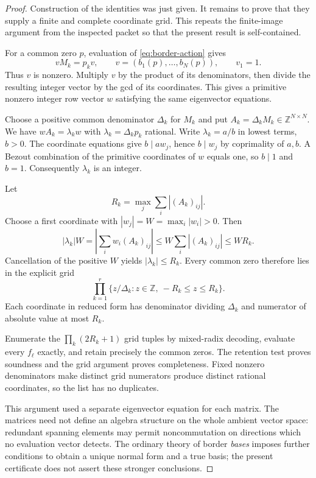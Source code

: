 \begin{proof}
Construction of the identities was just given. It remains to prove that
they supply a finite and complete coordinate grid. This repeats the
finite-image argument from the inspected packet so that the present
result is self-contained.

For a common zero $p$, evaluation of \eqref{eq:border-action} gives
\[
       vM_k=p_kv,\qquad v=(b_1(p),\ldots,b_N(p)),\qquad v_1=1.
\]
Thus $v$ is nonzero. Multiply $v$ by the product of its denominators,
then divide the resulting integer vector by the gcd of its coordinates.
This gives a primitive nonzero integer row vector $w$ satisfying the
same eigenvector equations.

Choose a positive common denominator $\Delta_k$ for $M_k$ and put
$A_k=\Delta_kM_k\in\mathbb Z^{N\times N}$. We have
$wA_k=\lambda_kw$ with $\lambda_k=\Delta_kp_k$ rational.
Write $\lambda_k=a/b$ in lowest terms, $b>0$. The coordinate equations
give $b\mid a w_j$, hence $b\mid w_j$ by coprimality of $a,b$.
A Bezout combination of the primitive coordinates of $w$ equals one,
so $b\mid1$ and $b=1$. Consequently $\lambda_k$ is an integer.

Let
\[
        R_k=\max_j\sum_i|(A_k)_{ij}|.
\]
Choose a first coordinate with $|w_j|=W=\max_i|w_i|>0$. Then
\[
 |\lambda_k|W
 =\left|\sum_iw_i(A_k)_{ij}\right|
 \le W\sum_i|(A_k)_{ij}|\le WR_k.
\]
Cancellation of the positive $W$ yields $|\lambda_k|\le R_k$.
Every common zero therefore lies in the explicit grid
\begin{equation}
       \prod_{k=1}^r
          \{z/\Delta_k:z\in\mathbb Z,\ -R_k\le z\le R_k\}.
\label{eq:border-grid}
\end{equation}
Each coordinate in reduced form has denominator dividing $\Delta_k$
and numerator of absolute value at most $R_k$.

Enumerate the $\prod_k(2R_k+1)$ grid tuples by mixed-radix decoding,
evaluate every $f_\ell$ exactly, and retain precisely the common zeros.
The retention test proves soundness and the grid argument proves
completeness. Fixed nonzero denominators make distinct grid numerators
produce distinct rational coordinates, so the list has no duplicates.

This argument used a separate eigenvector equation for each matrix.
The matrices need not define an algebra structure on the whole ambient
vector space: redundant spanning elements may permit noncommutation on
directions which no evaluation vector detects. The ordinary theory of
border \emph{bases} imposes further conditions to obtain a unique normal
form and a true basis; the present certificate does not assert these
stronger conclusions.


\end{proof}
